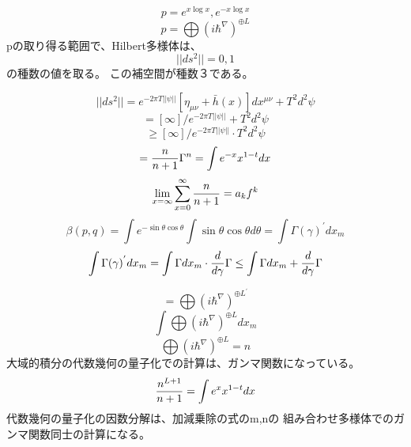 \documentclass{jsarticle}
\begin{document}
{    $$ p = e^{x \log x},e^{-x \log x} $$
    $$ p = \bigoplus{(i \hbar^{\nabla})}^{\oplus L} $$
    pの取り得る範囲で、Hilbert多様体は、
    $$ ||ds^2|| = 0,1 $$
    の種数の値を取る。
    この補空間が種数３である。

  $$ ||ds^2|| = e^{-2\pi T||\psi||}[\eta_{\mu\nu} + \bar{h}(x)]dx^{{\mu}{\nu}}
  + T^2d^2 \psi $$
  $$ = [\infty]/e^{-2\pi T||\psi||} + T^2d^2\psi $$
  $$ \ge  [\infty]/e^{-2\pi T||\psi||} \cdot T^2d^2\psi $$
  $$ = {n \over {n + 1}}\Gamma^n = \int e^{-x}x^{1 - t}dx $$
  $$ \lim_{x = \infty }\sum_{x = 0}^{\infty}{{n}\over {n + 1}} = a_k f^k $$
  $$ \beta(p,q) = \int e^{-\sin \theta \cos \theta}\int \sin \theta \cos \theta
  d\theta = \int \Gamma(\gamma)^{'}dx_m $$
  $$ \int \Gamma(\gamma)^{'}dx_m = \int \Gamma dx_m \cdot {d \over d\gamma}
  \Gamma \le \int \Gamma dx_m + {d \over d \gamma}\Gamma $$

$$ = \bigoplus({i \hbar^{\nabla}})^{\oplus L^{'}} $$
   $$ \int \bigoplus({i \hbar^{\nabla}})^{\oplus L} dx_m $$
   $$ \bigoplus({i \hbar^{\nabla}})^{\oplus L} = n $$
   大域的積分の代数幾何の量子化での計算は、ガンマ関数になっている。
   $$ {n^{L+1} \over {n+1}} = \int e^x x^{1 - t} dx $$
   代数幾何の量子化の因数分解は、加減乗除の式のm,nの
   組み合わせ多様体でのガンマ関数同士の計算になる。



}
\end{document}

